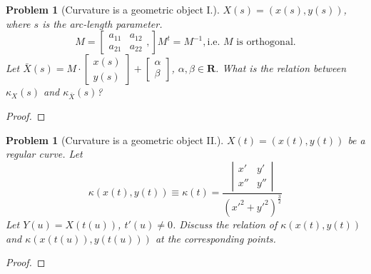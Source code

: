 \documentclass[12pt,a4paper]{article}
\newcounter{theProblemCounter}
\newtheorem{problem}[theProblemCounter]{Problem}
\begin{document}
\setcounter{theProblemCounter}{7}
\begin{problem}[Curvature is a geometric object I.]
$X(s)=(x(s), y(s))$, where $s$ is the arc-length parameter.
\[ M = \left[
\begin{array}{cc} a_{11} & a_{12} \\ a_{21} & a_{22} \end{array},
\right]
M^t = M^{-1}, \mbox{i.e. $M$ is orthogonal.}
\]
Let $\bar{X}(s) = M\cdot \left[\begin{array}{c} x(s)\\y(s)\end{array}\right] + \left[\begin{array}{c}\alpha \\ \beta\end{array}\right]$,  $\alpha, \beta\in \mathbf{R}$. What is the relation between $\kappa_X(s)$ and $\kappa_{\bar{X}}(s)$?
\end{problem}
\begin{proof}
\end{proof}

\begin{problem}[Curvature is a geometric object II.]
$X(t) = (x(t), y(t))$ be a regular curve. Let
\[ \kappa(x(t), y(t)) \equiv \kappa(t) = \frac{
\left|
\begin{array}{cc} x' & y' \\ x'' & y'' \end{array}
\right|
}{(x'^2+y'^2)^\frac32} \]
Let $Y(u) = X(t(u))$, $t'(u)\ne 0$. Discuss the relation of $\kappa(x(t), y(t))$ and $\kappa(x(t(u)), y(t(u)))$ at the corresponding points.
\end{problem}
\begin{proof}
\end{proof}
\end{document}
